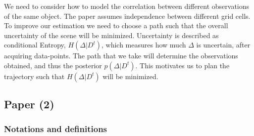 \documentclass{article}
\begin{document}
	We need to consider how to model the correlation between different observations of the same object. The paper assumes independence between different grid cells.
	To improve our estimation we need to choose a path such that the overall uncertainty of the scene will be minimized.
	Uncertainty is described as conditional Entropy, $H(\Delta|D^t)$, which measures how much $\Delta$ is uncertain, after acquiring data-points. The path that we take will determine the observations obtained, and thus the posterior $p(\Delta|D^t)$. This motivates us to plan the trajectory such that $H(\Delta|D^t)$ will be minimized.
	
	\subsection{Paper (2)}
	\subsubsection{Notations and definitions}
\end{document}
